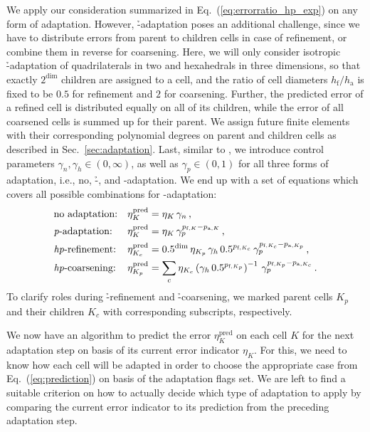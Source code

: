 We apply our consideration summarized in Eq.~(\ref{eq:errorratio_hp_exp}) on any form of adaptation. However, \h-adaptation poses an additional challenge, since we have to distribute errors from parent to children cells in case of refinement, or combine them in reverse for coarsening. Here, we will only consider isotropic \h-adaptation of quadrilaterals in two and hexahedrals in three dimensions, so that exactly $2^\text{dim}$ children are assigned to a cell, and the ratio of cell diameters $h_\text{f} / h_\text{a}$ is fixed to be $0.5$ for refinement and $2$ for coarsening. Further, the predicted error of a refined cell is distributed equally on all of its children, while the error of all coarsened cells is summed up for their parent. We assign future finite elements with their corresponding polynomial degrees on parent and children cells as described in Sec.~\ref{sec:adaptation}. Last, similar to \textcite{melenk2001}, we introduce control parameters $\gamma_n, \gamma_h \in (0, \infty)$, as well as $\gamma_p \in (0,1)$ for all three forms of adaptation, i.e., no, \h-, and \p-adaptation. We end up with a set of equations which covers all possible combinations for \hp-adaptation:
\begin{subequations}
\begin{align}
&\text{no adaptation:} & \eta^\text{pred}_K &= \eta_K \, \gamma_n \,\text{,} \\
&\text{\textit{p}-adaptation:} & \eta^\text{pred}_K &= \eta_K \, \gamma_p^{p_{\text{f},K} - p_{\text{a},K}} \,\text{,} \\
&\text{\textit{hp}-refinement:} &\eta^\text{pred}_{K_c} &= 0.5^{\text{dim}} \, \eta_{K_p} \, \gamma_h \, 0.5^{p_{\text{f},K_c}} \, \gamma_p^{p_{\text{f},K_c} - p_{\text{a},K_p}} \,\text{,} \\
&\text{\textit{hp}-coarsening:} & \eta^\text{pred}_{K_p} &= \sum\limits_{c} \eta_{K_c} \left( \gamma_h \, 0.5^{p_{\text{f},K_p}} \right)^{-1} \, \gamma_p^{p_{\text{f},K_p} - p_{\text{a},K_c}} \,\text{.} 
\end{align}
\label{eq:prediction}
\end{subequations}
To clarify roles during \h-refinement and \h-coarsening, we marked parent cells $K_p$ and their children $K_c$ with corresponding subscripts, respectively.

We now have an algorithm to predict the error $\eta^\text{pred}_K$ on each cell $K$ for the next adaptation step on basis of its current error indicator $\eta_K$. For this, we need to know how each cell will be adapted in order to choose the appropriate case from Eq.~(\ref{eq:prediction}) on basis of the adaptation flags set. We are left to find a suitable criterion on how to actually decide which type of adaptation to apply by comparing the current error indicator to its prediction from the preceding adaptation step.


